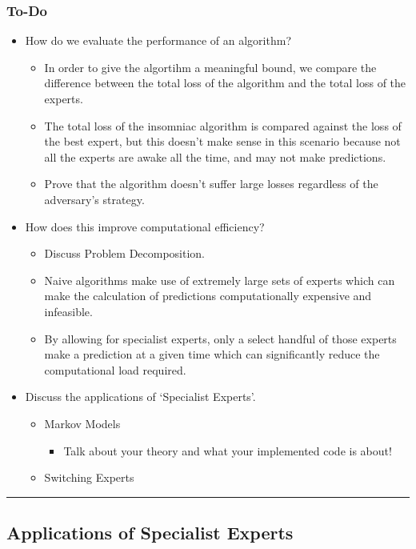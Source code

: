 \subsubsection*{To-Do}
\begin{itemize}
    \item How do we evaluate the performance of an algorithm?
    \begin{itemize}
        \item In order to give the algortihm a meaningful bound, we compare the difference between the total loss of the algorithm and the total loss of the experts.
        \item The total loss of the insomniac algorithm is compared against the loss of the best expert, but this doesn't make sense in this scenario because not all the experts are awake all the time, and may not make predictions.
        \item Prove that the algorithm doesn't suffer large losses regardless of the adversary's strategy.
    \end{itemize}
    \item How does this improve computational efficiency?
    \begin{itemize}
        \item Discuss Problem Decomposition.
        \item Naive algorithms make use of extremely large sets of experts which can make the calculation of predictions computationally expensive and infeasible.
        \item By allowing for specialist experts, only a select handful of those experts make a prediction at a given time which can significantly reduce the computational load required.
    \end{itemize}
    \item Discuss the applications of `Specialist Experts'.
    \begin{itemize}
        \item Markov Models
        \begin{itemize}
            \item Talk about your theory and what your implemented code is about!
        \end{itemize}
        \item Switching Experts
    \end{itemize}
\end{itemize}

\noindent\rule{\textwidth}{0.1pt}

\subsection{Applications of Specialist Experts}